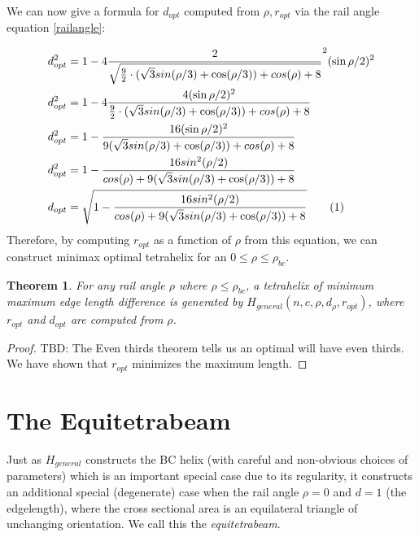 \documentclass[11pt]{article}
\newtheorem{theorem}{Theorem}
\newcommand\numberthis{\addtocounter{equation}{1}\tag{\theequation}}
\begin{document}
We can now give a formula for $ d_{opt} $ computed from $\rho, r_{opt}$ via the rail angle equation \eqref{railangle}:

\begin{align*}
  d_{opt}^2 &= 1 - 4 \frac{2}{\sqrt{\frac{9}{2} \cdot ( \sqrt{3} sin(\rho/3) + \cos(\rho/3)) + cos(\rho)+ 8 }}^2 (\sin{ \rho / 2})^2   \\
  d_{opt}^2 &= 1 - 4 \frac{4(\sin{ \rho / 2})^2}{\frac{9}{2} \cdot ( \sqrt{3} sin(\rho/3) + \cos(\rho/3)) + cos(\rho)+ 8 }    \\
  d_{opt}^2 &= 1 - \frac{16(\sin{ \rho / 2})^2}{9 ( \sqrt{3} sin(\rho/3) + \cos(\rho/3)) + cos(\rho)+ 8 }    \\
  d_{opt}^2 &= 1 - \frac{16 sin^2(\rho / 2) }{ cos(\rho) + 9( \sqrt{3} sin(\rho/3) + \cos(\rho/3)) + 8 }   \\
    d_{opt} &= \sqrt{1 - \frac{16 sin^2(\rho / 2) }{ cos(\rho) + 9( \sqrt{3} sin(\rho/3) + \cos(\rho/3)) + 8 }}    \numberthis  \label{dopt}  \\      
\end{align*}
Therefore, by computing $r_{opt}$ as a function of $\rho$ from this equation, we can construct minimax optimal tetrahelix for an $0 \leq \rho \leq \rho_{bc}$.

\begin{theorem}
  \label{optimality}
  For any rail angle $\rho$ where $\rho \leq \rho_{bc}$, a tetrahelix of minimum maximum edge length
  difference is generated by $H_{general}(n,c,\rho,d_{\rho},r_{opt})$, where $r_{opt}$ and $d_{opt}$ are
  computed from $\rho$. 
\end{theorem}

\begin{proof}
  TBD: The Even thirds theorem tells us an optimal will have even thirds.  We have shown
  that $r_{opt}$ minimizes the maximum length.
  \end{proof}

\section{The Equitetrabeam}

Just as $H_{general}$ constructs the BC helix (with careful and non-obvious choices of parameters)
which is an important
special case due to its regularity, it constructs an additional special
(degenerate) case when the rail angle $\rho = 0$
and $d = 1$ (the edgelength), where the cross sectional area is
an equilateral triangle of unchanging orientation.
We call this the \emph{equitetrabeam}.
\end{document}
